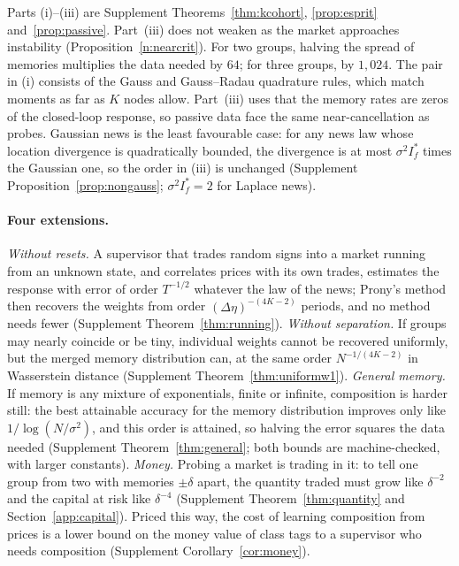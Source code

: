 \documentclass[12pt]{article}
\theoremstyle{definition}
\theoremstyle{remark}
\begin{document}
Parts (i)--(iii) are Supplement Theorems~\ref{thm:kcohort}, \ref{prop:esprit} and~\ref{prop:passive}. Part~(iii) does not weaken as the market approaches instability (Proposition~\ref{n:nearcrit}). For two groups, halving the spread of memories multiplies the data needed by $64$; for three groups, by $1{,}024$. The pair in (i) consists of the Gauss and Gauss--Radau quadrature rules, which match moments as far as $K$ nodes allow. Part~(iii) uses that the memory rates are zeros of the closed-loop response, so passive data face the same near-cancellation as probes. Gaussian news is the least favourable case: for any news law whose location divergence is quadratically bounded, the divergence is at most $\sigma^2I^*_f$ times the Gaussian one, so the order in (iii) is unchanged (Supplement Proposition~\ref{prop:nongauss}; $\sigma^2I^*_f=2$ for Laplace news).

\paragraph{Four extensions.} \emph{Without resets.} A supervisor that trades random signs into a market running from an unknown state, and correlates prices with its own trades, estimates the response with error of order $T^{-1/2}$ whatever the law of the news; Prony's method then recovers the weights from order $(\Delta\eta)^{-(4K-2)}$ periods, and no method needs fewer (Supplement Theorem~\ref{thm:running}). \emph{Without separation.} If groups may nearly coincide or be tiny, individual weights cannot be recovered uniformly, but the merged memory distribution can, at the same order $N^{-1/(4K-2)}$ in Wasserstein distance (Supplement Theorem~\ref{thm:uniformw1}). \emph{General memory.} If memory is any mixture of exponentials, finite or infinite, composition is harder still: the best attainable accuracy for the memory distribution improves only like $1/\log(N/\sigma^2)$, and this order is attained, so halving the error squares the data needed (Supplement Theorem~\ref{thm:general}; both bounds are machine-checked, with larger constants). \emph{Money.} Probing a market is trading in it: to tell one group from two with memories $\pm\delta$ apart, the quantity traded must grow like $\delta^{-2}$ and the capital at risk like $\delta^{-4}$ (Supplement Theorem~\ref{thm:quantity} and Section~\ref{app:capital}). Priced this way, the cost of learning composition from prices is a lower bound on the money value of class tags to a supervisor who needs composition (Supplement Corollary~\ref{cor:money}).
\end{document}
